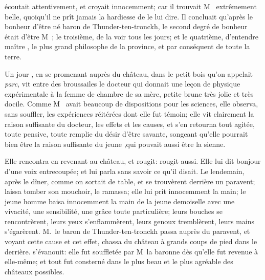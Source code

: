 


 écoutait attentivement, et croyait innocemment; car il trouvait
M~ extrêmement belle, quoiqu’il ne prît jamais la
hardiesse de le lui dire. Il concluait qu’après le bonheur d’être né
baron de Thunder-ten-tronckh, le second degré de bonheur était d’être
M~; le troisième, de la voir tous les jours; et le
quatrième, d’entendre maître , le plus grand philosophe de la
province, et par conséquent de toute la terre.


Un jour , en se promenant auprès du château, dans le petit
bois qu’on appelait \emph{parc}, vit entre des broussailes le docteur
 qui donnait une leçon de physique expérimentale à la femme de
chambre de sa mère, petite brune très jolie et très docile. Comme
M~ avait beaucoup de dispositions pour les sciences,
elle observa, sans souffler, les expériences réitérées dont elle fut
témoin; elle vit clairement la raison suffisante du docteur, les effets
et les causes, et s’en retourna tout agitée, toute pensive, toute
remplie du désir d’être savante, songeant qu’elle pourrait bien être la
raison suffisante du jeune ,\linebreak qui pouvait aussi être la sienne.

Elle rencontra  en revenant au château, et rougit: 
rougit aussi. Elle lui dit bonjour d’une voix entrecoupée; et 
lui parla sans savoir ce qu’il disait. Le lendemain, après le dîner,
comme on sortait de table,  et  se trouvèrent derrière
un paravent;  laissa tomber son mouchoir,  le ramassa;
elle lui prit innocemment la main; le jeune homme baisa innocemment la
main de la jeune demoiselle avec une vivacité, une sensibilité, une
grâce toute particulière; leurs bouches se rencontrèrent, leurs yeux
s’enflammèrent, leurs genoux tremblèrent, leurs mains s’égarèrent. 
M.~le baron de Thunder-ten-tronckh passa auprès du paravent, et voyant
cette cause et cet effet, chassa  du château à grands coups de
pied dans le derrière.  s’évanouit: elle fut souffletée par
M~la baronne dès qu’elle fut revenue à elle-même; et tout fut
consterné dans le plus beau et le plus agréable des châteaux possibles.




